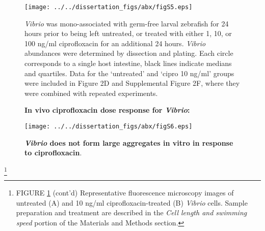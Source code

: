 {{%

\begin{figure}[H]
	\centerline{
		\texttt{[image: ../../dissertation\_figs/abx/figS5.eps]}}
	\caption{\textbf{In vivo ciprofloxacin dose response for \textit{Vibrio}:}}{\textit{Vibrio} was mono-associated with germ-free larval zebrafish for 24 hours prior to being left untreated, or treated with either 1, 10, or 100 ng/ml ciprofloxacin for an additional 24 hours.  \textit{Vibrio} abundances were determined by dissection and plating. Each circle corresponds to a single host intestine, black lines indicate medians and quartiles. Data for the `untreated' and `cipro 10 ng/ml' groups were included in Figure 2D and Supplemental Figure 2F, where they were combined with repeated experiments.}
\end{figure}



\begin{figure}[H]
	\centerline{
		\texttt{[image: ../../dissertation\_figs/abx/figS6.eps]}} 
	\caption{\textbf{\textit{Vibrio} does not form large aggregates in vitro in response to ciprofloxacin}.}
	\label{fig:figS6}
\end{figure}

{\let\thefootnote\relax\footnote{FIGURE \ref{fig:figS6} (cont'd) Representative fluorescence microscopy images of untreated (A) and 10 ng/ml ciprofloxacin-treated (B) \textit{Vibrio} cells. Sample preparation and treatment are described in the \textit{Cell length and swimming speed} portion of the Materials and Methods section.}
		

}}}
